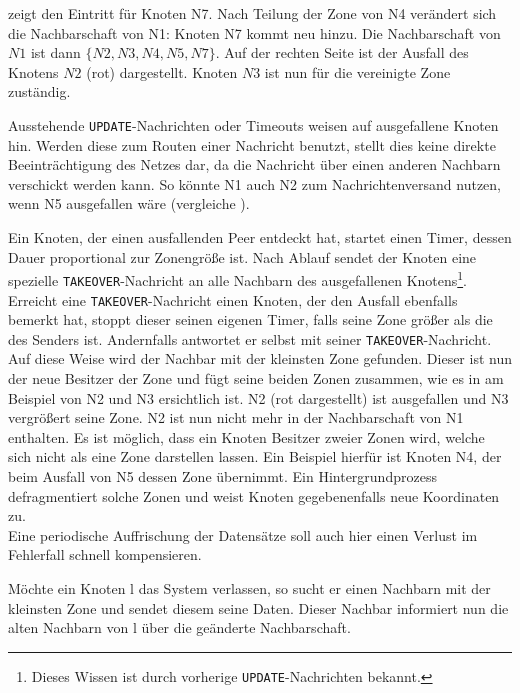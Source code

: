  zeigt den Eintritt für Knoten N7. Nach Teilung der Zone von N4 verändert sich die Nachbarschaft von N1: Knoten N7 kommt neu hinzu. Die Nachbarschaft von $N1$ ist dann $\{N2, N3, N4, N5, N7\}$. Auf der rechten Seite ist der Ausfall des Knotens $N2$ (rot) dargestellt. Knoten $N3$ ist nun für die vereinigte Zone zuständig.

Ausstehende \texttt{UPDATE}-Nachrichten oder Timeouts weisen auf ausgefallene Knoten hin. Werden diese zum Routen einer Nachricht benutzt, stellt dies keine direkte Beeinträchtigung des Netzes dar, da die Nachricht über einen anderen Nachbarn verschickt werden kann. So könnte N1 auch N2 zum Nachrichtenversand nutzen, wenn N5 ausgefallen wäre (vergleiche ).

Ein Knoten, der einen ausfallenden Peer entdeckt hat, startet einen Timer, dessen Dauer proportional zur Zonengröße ist. Nach Ablauf sendet der Knoten eine spezielle \texttt{TAKEOVER}-Nachricht an alle Nachbarn des ausgefallenen Knotens\footnote{Dieses Wissen ist durch vorherige \texttt{UPDATE}-Nachrichten bekannt.}. Erreicht eine \texttt{TAKEOVER}-Nachricht einen Knoten, der den Ausfall ebenfalls bemerkt hat, stoppt dieser seinen eigenen Timer, falls seine Zone größer als die des Senders ist. Andernfalls antwortet er selbst mit seiner \texttt{TAKEOVER}-Nachricht. Auf diese Weise wird der Nachbar mit der kleinsten Zone gefunden. Dieser ist nun der neue Besitzer der Zone und fügt seine beiden Zonen zusammen, wie es in  am Beispiel von N2 und N3 ersichtlich ist. N2 (rot dargestellt) ist ausgefallen und N3 vergrößert seine Zone. N2 ist nun nicht mehr in der Nachbarschaft von N1 enthalten. Es ist möglich, dass ein Knoten Besitzer zweier Zonen wird, welche sich nicht als eine Zone darstellen lassen. Ein Beispiel hierfür ist Knoten N4, der beim Ausfall von N5 dessen Zone übernimmt. Ein Hintergrundprozess defragmentiert solche Zonen und weist Knoten gegebenenfalls neue Koordinaten zu.\\
Eine periodische Auffrischung der Datensätze soll auch hier einen Verlust im Fehlerfall schnell kompensieren.

Möchte ein Knoten l das System verlassen, so sucht er einen Nachbarn mit der kleinsten Zone und sendet diesem seine Daten. Dieser Nachbar informiert nun die alten Nachbarn von l über die geänderte Nachbarschaft.
